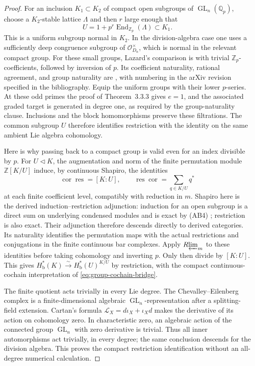 \documentclass[11pt]{article}
\numberwithin{equation}{section}
\theoremstyle{definition}
\theoremstyle{remark}
\begin{document}
\begin{proof}
For an inclusion \(K_1\subset K_2\) of compact open subgroups of
\(\operatorname{GL}_n(\mathbb Q_p)\), choose a \(K_2\)-stable lattice \(\Lambda\) and then
\(r\) large enough that
\[
 U=1+p^r\operatorname{End}_{\mathbb Z_p}(\Lambda)\subset K_1.
\]
This is a uniform subgroup normal in \(K_2\). In the division-algebra
case one uses a sufficiently deep congruence subgroup of
\(\mathcal O_{D_n}^{\times}\), which is normal in the relevant compact group.
For these small groups, Lazard's comparison is
\cite[Theorem~3.3.3 and Remark~3.3.4]{HKN2011} with trivial
\(\mathbb Z_p\)-coefficients, followed by inversion of \(p\).
Its coefficient naturality, rational agreement, and group naturality are
\cite[Theorem~3.1.1(1)--(3)]{HKN2011}, with numbering in the arXiv
revision specified in the bibliography. Equip the uniform groups with
their lower \(p\)-series. At these odd primes the proof of
Theorem~3.3.3 gives \(e=1\), and the associated graded target is generated
in degree one, as required by the group-naturality clause. Inclusions and
the block homomorphisms preserve these filtrations. The common subgroup
\(U\) therefore identifies restriction with the identity on the same
ambient Lie algebra cohomology.

Here is why passing back to a compact group is valid even for an index
divisible by \(p\). For \(U\triangleleft K\), the augmentation and norm
of the finite permutation module \(\mathbb Z[K/U]\) induce, by continuous
Shapiro, the identities
\[
 \operatorname{cor}\operatorname{res}=[K:U],\qquad
 \operatorname{res}\operatorname{cor}
      =\sum_{q\in K/U}q^*
\]
at each finite coefficient level, compatibly with reduction in \(m\).
Shapiro here is the derived induction--restriction adjunction: induction
for an open subgroup is a direct sum on underlying condensed modules and
is exact by (AB4) \cite[Theorems~2.2 and~2.4]{Tang2026}; restriction is
also exact. Their adjunction therefore descends directly to derived
categories. Its naturality identifies the
permutation maps with the actual restrictions and conjugations in the
finite continuous bar complexes. Apply \(R\!\varprojlim_m\) to these identities
before taking cohomology and inverting \(p\). Only then divide by
\([K:U]\). This gives
\(H^*_{\mathrm b}(K)\xrightarrow{\sim}H^*_{\mathrm b}(U)^{K/U}\)
by restriction, with the compact
continuous-cochain interpretation of \eqref{eq:group-cochain-bridge}.

The finite quotient acts trivially in every Lie degree. The
Chevalley--Eilenberg complex is a finite-dimensional algebraic
\(\operatorname{GL}_n\)-representation after a splitting-field extension. Cartan's
formula \(\mathcal L_X=d\iota_X+\iota_Xd\) makes the derivative of its
action on cohomology zero. In characteristic zero, an algebraic action
of the connected group \(\operatorname{GL}_n\) with zero derivative is trivial.
Thus all inner automorphisms act trivially, in every degree; the same
conclusion descends for the division algebra. This proves the compact
restriction identification without an all-degree numerical calculation.


\end{proof}
\end{document}
